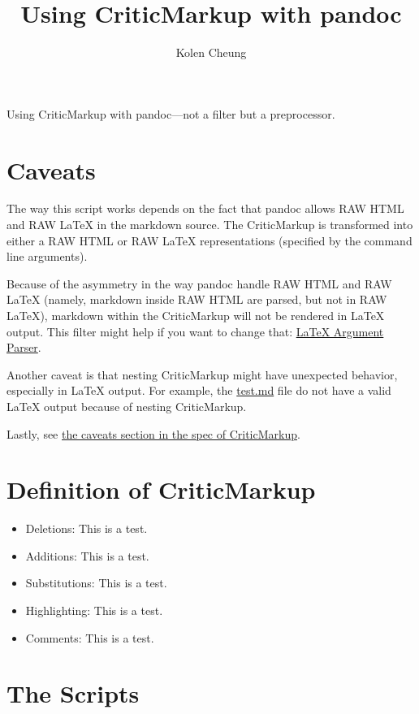 \documentclass[]{article}
\title{Using CriticMarkup with pandoc}
\author{Kolen Cheung}
\date{}
\providecommand{\tightlist}{%
  \setlength{\itemsep}{0pt}\setlength{\parskip}{0pt}}
\begin{document}
\maketitle

Using CriticMarkup with pandoc---not a filter but a preprocessor.

\section{Caveats}\label{caveats}

The way this script works depends on the fact that pandoc allows RAW
HTML and RAW LaTeX in the markdown source. The CriticMarkup is
transformed into either a RAW HTML or RAW LaTeX representations
(specified by the command line arguments).

Because of the asymmetry in the way pandoc handle RAW HTML and RAW LaTeX
(namely, markdown inside RAW HTML are parsed, but not in RAW LaTeX),
markdown within the CriticMarkup will not be rendered in LaTeX output.
This filter might help if you want to change that:
\href{https://gist.github.com/mpickering/f1718fcdc4c56273ed52}{LaTeX
Argument Parser}.

Another caveat is that nesting CriticMarkup might have unexpected
behavior, especially in LaTeX output. For example, the \url{test.md}
file do not have a valid LaTeX output because of nesting CriticMarkup.

Lastly, see \href{http://criticmarkup.com/spec.php\#caveats}{the caveats
section in the spec of CriticMarkup}.

\section{Definition of CriticMarkup}\label{definition-of-criticmarkup}

\begin{itemize}
\tightlist
\item
  Deletions: This is a test.
\item
  Additions: This is a test.
\item
  Substitutions: This is a test.
\item
  Highlighting: This is a test.
\item
  Comments: This is a test.
\end{itemize}

\section{The Scripts}\label{the-scripts}
\end{document}
